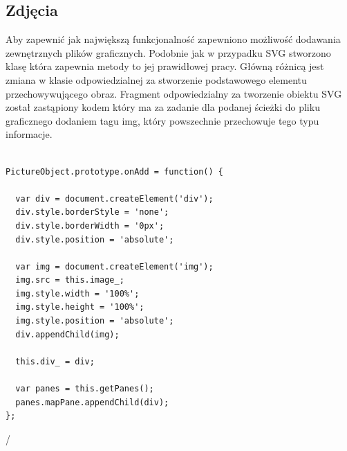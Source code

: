 \subsection{Zdjęcia}
\label{subsec:pictures}

Aby zapewnić jak największą funkcjonalność zapewniono możliwość dodawania zewnętrznych plików graficznych.
Podobnie jak w przypadku SVG stworzono klasę która zapewnia metody to jej prawidłowej pracy. Główną różnicą jest zmiana w klasie odpowiedzialnej za stworzenie podstawowego elementu przechowywującego obraz. Fragment odpowiedzialny za tworzenie obiektu SVG został zastąpiony kodem który ma za zadanie dla podanej ścieżki do pliku graficznego dodaniem tagu img, który powszechnie przechowuje tego typu informacje.

\lstset{language=JavaScript}
\begin{lstlisting}[label={lst:svgImpl},caption={Klasa do obsługi SVG}]

PictureObject.prototype.onAdd = function() {

  var div = document.createElement('div');
  div.style.borderStyle = 'none';
  div.style.borderWidth = '0px';
  div.style.position = 'absolute';

  var img = document.createElement('img');
  img.src = this.image_;
  img.style.width = '100%';
  img.style.height = '100%';
  img.style.position = 'absolute';
  div.appendChild(img);

  this.div_ = div;

  var panes = this.getPanes();
  panes.mapPane.appendChild(div);
};

\end{lstlisting}/